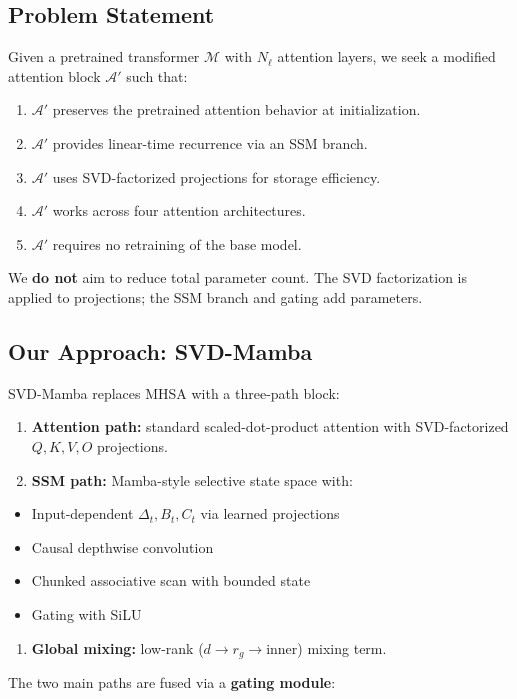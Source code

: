 \subsection{Problem Statement}

Given a pretrained transformer $\mathcal{M}$ with $N_\ell$ attention layers, 
we seek a modified attention block $\mathcal{A}'$ such that:

\begin{enumerate}
\item $\mathcal{A}'$ preserves the pretrained attention behavior at initialization.
\item $\mathcal{A}'$ provides linear-time recurrence via an SSM branch.
\item $\mathcal{A}'$ uses SVD-factorized projections for storage efficiency.
\item $\mathcal{A}'$ works across four attention architectures.
\item $\mathcal{A}'$ requires no retraining of the base model.

\end{enumerate}
We \textbf{do not} aim to reduce total parameter count. The SVD factorization 
is applied to projections; the SSM branch and gating add parameters.

\subsection{Our Approach: SVD-Mamba}

SVD-Mamba replaces MHSA with a three-path block:

\begin{enumerate}
\item \textbf{Attention path:} standard scaled-dot-product attention with
  SVD-factorized $Q, K, V, O$ projections.
\item \textbf{SSM path:} Mamba-style selective state space with:
\end{enumerate}
\begin{itemize}
\item Input-dependent $\Delta_t, B_t, C_t$ via learned projections
\item Causal depthwise convolution
\item Chunked associative scan with bounded state
\item Gating with SiLU
\end{itemize}
\begin{enumerate}
\item \textbf{Global mixing:} low-rank ($d \to r_g \to \text{inner}$) mixing term.

\end{enumerate}
The two main paths are fused via a \textbf{gating module}:

